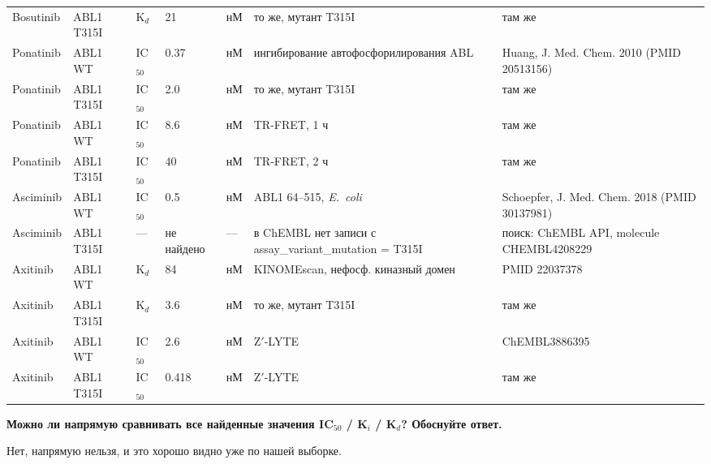 \documentclass[12pt,a4paper]{article}
\newcommand{\code}[1]{{\ttfamily #1}}
\begin{document}
\begin{center}
\begin{longtable}{L{1.7cm}L{1.5cm}L{1.0cm}L{1.3cm}L{0.7cm}L{3.2cm}L{4.0cm}}
Bosutinib & ABL1 T315I & K$_d$ & 21 & нМ & то же, мутант T315I & там же \\
Ponatinib & ABL1 WT & IC$_{50}$ & 0.37 & нМ & ингибирование автофосфорилирования ABL & Huang, J. Med. Chem. 2010 (PMID 20513156) \\
Ponatinib & ABL1 T315I & IC$_{50}$ & 2.0 & нМ & то же, мутант T315I & там же \\
Ponatinib & ABL1 WT & IC$_{50}$ & 8.6 & нМ & TR-FRET, 1 ч & там же \\
Ponatinib & ABL1 T315I & IC$_{50}$ & 40 & нМ & TR-FRET, 2 ч & там же \\
Asciminib & ABL1 WT & IC$_{50}$ & 0.5 & нМ & ABL1 64--515, \emph{E.~coli} & Schoepfer, J. Med. Chem. 2018 (PMID 30137981) \\
Asciminib & ABL1 T315I & --- & не найдено & --- & в ChEMBL нет записи с \code{assay\_variant\_mutation = T315I} & поиск: ChEMBL API, molecule CHEMBL4208229 \\
Axitinib & ABL1 WT & K$_d$ & 84 & нМ & KINOMEscan, нефосф. киназный домен & PMID 22037378 \\
Axitinib & ABL1 T315I & K$_d$ & 3.6 & нМ & то же, мутант T315I & там же \\
Axitinib & ABL1 WT & IC$_{50}$ & 2.6 & нМ & Z$'$-LYTE & ChEMBL3886395 \\
Axitinib & ABL1 T315I & IC$_{50}$ & 0.418 & нМ & Z$'$-LYTE & там же \\
\bottomrule
\end{longtable}
\end{center}

\medskip
\noindent\textbf{Можно ли напрямую сравнивать все найденные значения IC$_{50}$ / K$_i$ /
K$_d$? Обоснуйте ответ.}

Нет, напрямую нельзя, и это хорошо видно уже по нашей выборке.
\end{document}
